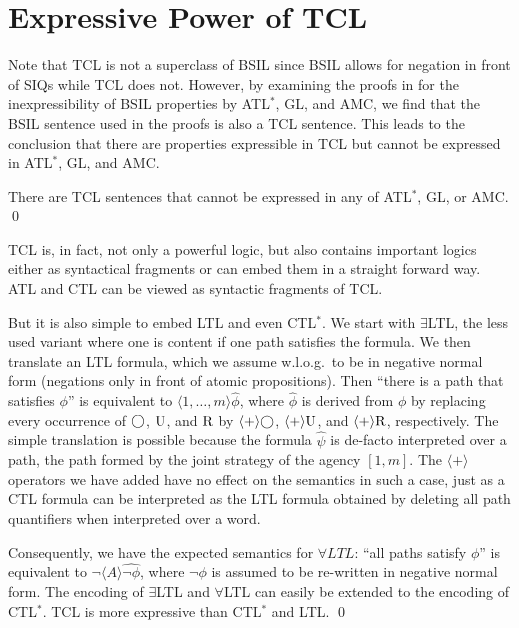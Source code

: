 \section{Expressive Power of TCL}
Note that TCL is not a superclass of BSIL since 
BSIL allows for negation in front of SIQs while TCL does not. 
However, by examining the proofs in \cite{WHY11} 
for the inexpressibility of BSIL properties by ATL$^*$, GL, and AMC, 
we find that the BSIL sentence used in the proofs is also a TCL sentence. 
This leads to the conclusion that 
there are properties expressible in TCL but cannot 
be expressed in ATL$^*$, GL, and AMC.  

{\lemma \label{lemma.express.incomp1} 
There are TCL sentences that cannot be expressed 
in any of ATL$^*$, GL, or AMC.  
} 
\qed 


TCL is, in fact, not only a powerful logic, 
but also contains important logics either as syntactical fragments or can embed them in a straight forward way.
ATL and CTL can be viewed as syntactic fragments of TCL.

But it is also simple to embed LTL and even CTL$^*$.
We start with $\exists$LTL, the less used variant 
where one is content if one path satisfies the formula.
We then translate an LTL formula, which we assume w.l.o.g.\ 
to be in negative normal form 
(negations only in front of atomic propositions).
Then ``there is a path that satisfies $\phi$'' is equivalent to
$\langle 1,\ldots,m \rangle \widehat{\phi}$, where $\widehat{\phi}$ is derived from $\phi$ by replacing every occurrence of $\bigcirc$, $\textrm{U}$, and $\textrm{R}$ by
$\langle + \rangle \bigcirc$, $\langle + \rangle \textrm{U}$, and $\langle + \rangle \textrm{R}$, respectively.
%
The simple translation is possible because the formula $\widehat{\psi}$ 
is de-facto interpreted over a path, 
the path formed by the joint strategy of the agency $[1,m]$.
The $\langle + \rangle$ operators we have added have no effect on the semantics in such a case, just as a CTL formula can be interpreted as the LTL formula obtained by deleting all path quantifiers when interpreted over a word.

Consequently, we have the expected semantics for $\forall LTL$:  ``all paths satisfy $\phi$'' is equivalent to
$\neg \langle A \rangle \widehat{\neg\phi}$, where $\neg \phi$ is assumed to be re-written in negative normal form.
% 
The encoding of $\exists$LTL and $\forall$LTL can easily be extended to the encoding of CTL$^*$.  
%
{\lemma \label{lemma.express.ctl.star}
TCL is more expressive than CTL$^*$ and LTL.  
}
\qed 

